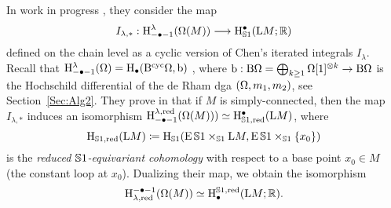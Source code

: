 \documentclass[\MainFolder/Text.tex]{subfiles}
\begin{document}

In work in progress \cite{Cieliebak2018b}, they consider the map 
$$I_{\lambda,*}: \mathrm{H}^{\lambda}_{-\bullet- 1}(\Omega(M)) \longrightarrow \mathrm{H}_{\mathbb{S}{1}}^\bullet(\mathrm{L} M; \mathbb{R})$$ defined on the chain level as a cyclic version of Chen's iterated integrals $I_\lambda$. Recall that $\mathrm{H}^{\lambda}_{-\bullet-1}(\Omega) = \mathrm{H}_\bullet(\mathrm{B}^{\mathrm{cyc}} \Omega, \mathrm{b})$ ,
where $\mathrm{b}: \mathrm{B} \Omega = \bigoplus_{k\ge 1} \Omega[1]^{\otimes k} \rightarrow \mathrm{B} \Omega $ is the Hochschild differential of the de Rham dga $(\Omega,m_1,m_2)$, see Section~\ref{Sec:Alg2}. They prove in \cite{Cieliebak2018b} that if $M$ is simply-connected, then the map~$I_{\lambda,*}$ induces an isomorphism $\mathrm{H}^{\lambda,\mathrm{red}}_{-\bullet-1}(\Omega(M))) \simeq \mathrm{H}_{\mathbb{S}{1}, \mathrm{red}}^\bullet(\mathrm{L} M)$, where 
$$ \mathrm{H}_{\mathbb{S}{1}, \mathrm{red}}(\mathrm{L} M) \coloneqq \mathrm{H}_{\mathbb{S}{1}}(\operatorname{E} \mathbb{S}{1} \times_{\mathbb{S}{1}} \mathrm{L} M, \operatorname{E} \mathbb{S}{1} \times_{\mathbb{S}{1}} \{x_0\}) $$
is the \emph{reduced $\mathbb{S}{1}$-equivariant cohomology} with respect to a base point $x_0 \in M$ (the constant loop at $x_0$). Dualizing their map, we obtain the isomorphism 
\begin{equation}\label{Eq:StringIsom}
\mathrm{H}_{\lambda,\mathrm{red}}^{-\bullet-1}(\Omega(M))\simeq \mathrm{H}^{\mathbb{S}{1}, \mathrm{red}}_\bullet(\mathrm{L} M; \mathbb{R}).
\end{equation}

\end{document}
